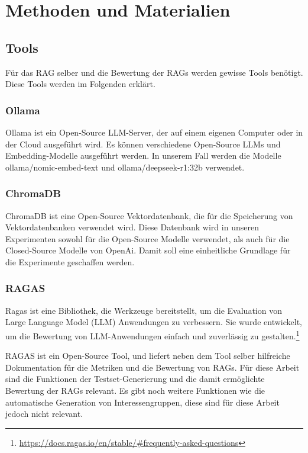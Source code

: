 \section{Methoden und Materialien}

\subsection{Tools}

Für das RAG selber und die Bewertung der RAGs werden gewisse Tools benötigt.
Diese Tools werden im Folgenden erklärt.

\subsubsection{Ollama}
Ollama ist ein Open-Source LLM-Server, der auf einem eigenen Computer oder in der Cloud ausgeführt wird.
Es können verschiedene Open-Source LLMs und Embedding-Modelle ausgeführt werden. In unserem Fall werden die Modelle ollama/nomic-embed-text und ollama/deepseek-r1:32b verwendet.

\subsubsection{ChromaDB}
ChromaDB ist eine Open-Source Vektordatenbank, die für die Speicherung von Vektordatenbanken verwendet wird.
Diese Datenbank wird in unseren Experimenten sowohl für die Open-Source Modelle verwendet, als auch für die Closed-Source Modelle von OpenAi.
Damit soll eine einheitliche Grundlage für die Experimente geschaffen werden.

\subsubsection{RAGAS}
Ragas ist eine Bibliothek, die Werkzeuge bereitstellt, um die Evaluation von Large Language Model (LLM) Anwendungen zu verbessern. Sie wurde entwickelt, um die Bewertung von LLM-Anwendungen einfach und zuverlässig zu gestalten.\footnote{\url{https://docs.ragas.io/en/stable/#frequently-asked-questions}}

RAGAS ist ein Open-Source Tool, und liefert neben dem Tool selber hilfreiche Dokumentation für die Metriken und die Bewertung von RAGs.
Für diese Arbeit sind die Funktionen der Testset-Generierung und die damit ermöglichte Bewertung der RAGs relevant.
Es gibt noch weitere Funktionen wie die automatische Generation von Interessengruppen, diese sind für diese Arbeit jedoch nicht relevant.

